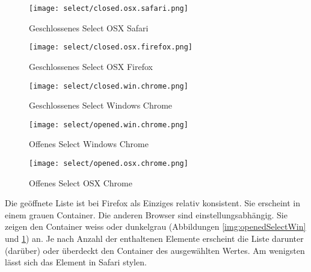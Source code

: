 \begin{figure}[!htb]
    \centering
    \begin{minipage}[b]{0.35\textwidth}
        \centering
        \begin{minipage}[t]{\textwidth}
            \centering
            \texttt{[image: select/closed.osx.safari.png]}
            \caption{\centering Geschlossenes Select OSX Safari}
            \label{img:closedSelectSafari}
        \end{minipage}
        \vspace{0.6cm}\newline
        \begin{minipage}[b]{\textwidth}
            \centering
            \texttt{[image: select/closed.osx.firefox.png]}
            \caption{\centering Geschlossenes Select OSX Firefox}
            \label{img:closedSelectFirefox}
        \end{minipage}
        \vspace{0.6cm}\newline
        \begin{minipage}[b]{\textwidth}
            \centering
            \texttt{[image: select/closed.win.chrome.png]}
            \caption{\centering Geschlossenes Select Windows Chrome}
            \label{img:closedSelectChrome}
        \end{minipage}
    \end{minipage}
    \hfill
    \begin{minipage}[b]{0.3\textwidth}
        \centering
        \texttt{[image: select/opened.win.chrome.png]}
        \caption{\centering Offenes Select Windows Chrome}
        \label{img:openedSelectWin}
    \end{minipage}
    \hfill
    \begin{minipage}[b]{0.2\textwidth}
        \centering
        \texttt{[image: select/opened.osx.chrome.png]}
        \caption{\centering Offenes Select OSX Chrome}
        \label{img:openedSelectOsx}
    \end{minipage}
\end{figure}

Die geöffnete Liste ist bei Firefox als Einziges relativ konsistent. 
Sie erscheint in einem grauen Container.
Die anderen Browser sind einstellungsabhängig. 
Sie zeigen den Container weiss oder dunkelgrau (Abbildungen \ref{img:openedSelectWin} und \ref{img:openedSelectOsx}) an. 
Je nach Anzahl der enthaltenen Elemente erscheint die Liste darunter (darüber) oder überdeckt den Container des ausgewählten Wertes. 
Am wenigsten lässt sich das Element in Safari stylen. 

